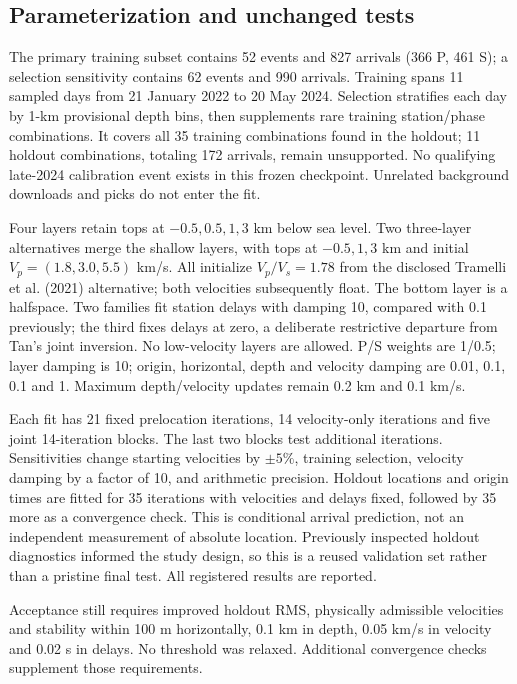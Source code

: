 \subsection*{Parameterization and unchanged tests}
The primary training subset contains 52 events and 827 arrivals (366 P, 461 S); a selection sensitivity contains 62 events and 990 arrivals. Training spans 11 sampled days from 21 January 2022 to 20 May 2024. Selection stratifies each day by 1-km provisional depth bins, then supplements rare training station/phase combinations. It covers all 35 training combinations found in the holdout; 11 holdout combinations, totaling 172 arrivals, remain unsupported. No qualifying late-2024 calibration event exists in this frozen checkpoint. Unrelated background downloads and picks do not enter the fit.

Four layers retain tops at $-0.5,0.5,1,3$ km below sea level. Two three-layer alternatives merge the shallow layers, with tops at $-0.5,1,3$ km and initial $V_p=(1.8,3.0,5.5)$ km/s. All initialize $V_p/V_s=1.78$ from the disclosed Tramelli et al. (2021) alternative; both velocities subsequently float. The bottom layer is a halfspace. Two families fit station delays with damping 10, compared with 0.1 previously; the third fixes delays at zero, a deliberate restrictive departure from Tan's joint inversion. No low-velocity layers are allowed. P/S weights are 1/0.5; layer damping is 10; origin, horizontal, depth and velocity damping are 0.01, 0.1, 0.1 and 1. Maximum depth/velocity updates remain 0.2 km and 0.1 km/s.

Each fit has 21 fixed prelocation iterations, 14 velocity-only iterations and five joint 14-iteration blocks. The last two blocks test additional iterations. Sensitivities change starting velocities by $\pm5\%$, training selection, velocity damping by a factor of 10, and arithmetic precision. Holdout locations and origin times are fitted for 35 iterations with velocities and delays fixed, followed by 35 more as a convergence check. This is conditional arrival prediction, not an independent measurement of absolute location. Previously inspected holdout diagnostics informed the study design, so this is a reused validation set rather than a pristine final test. All registered results are reported.

Acceptance still requires improved holdout RMS, physically admissible velocities and stability within 100 m horizontally, 0.1 km in depth, 0.05 km/s in velocity and 0.02 s in delays. No threshold was relaxed. Additional convergence checks supplement those requirements.

